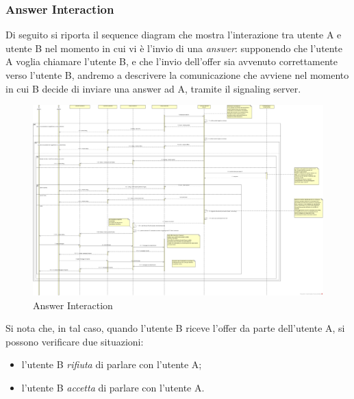 \subsubsection{Answer Interaction}

Di seguito si riporta il sequence diagram che mostra l'interazione tra utente A e utente B nel momento in cui vi è l'invio di una \textit{answer}: supponendo che l'utente A voglia chiamare l'utente B, e che l'invio dell'offer sia avvenuto correttamente verso l'utente B, andremo a descrivere la comunicazione che avviene nel momento in cui B decide di inviare una answer ad A, tramite il signaling server.\\

\begin{figure}[H]
	\centering
	\includegraphics[scale = .6]{img/sequence_answer.png}
	\caption{Answer Interaction}
	\label{gfx:answerinteraction}
\end{figure}

Si nota che, in tal caso, quando l'utente B riceve l'offer da parte dell'utente A, si possono verificare due situazioni:
\begin{itemize}
\item l'utente B \textit{rifiuta} di parlare con l'utente A;
\item l'utente B \textit{accetta} di parlare con l'utente A.
\end{itemize}

